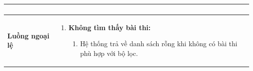 {\begin{tabularx}{\textwidth}{|>{\raggedright\arraybackslash}p{3.5cm}|>{\raggedright\arraybackslash}X|}
\begin{enumerate}
\begin{enumerate}
    \end{enumerate}
\end{enumerate} \\
\hline
\textbf{Luồng ngoại lệ} &
\begin{enumerate}
    \item \textbf{Không tìm thấy bài thi:}
    \begin{enumerate}
        \item[2Err.] Hệ thống trả về danh sách rỗng khi không có bài thi phù hợp với bộ lọc.
    \end{enumerate}
\end{enumerate} \\
\hline
\end{tabularx}
}
